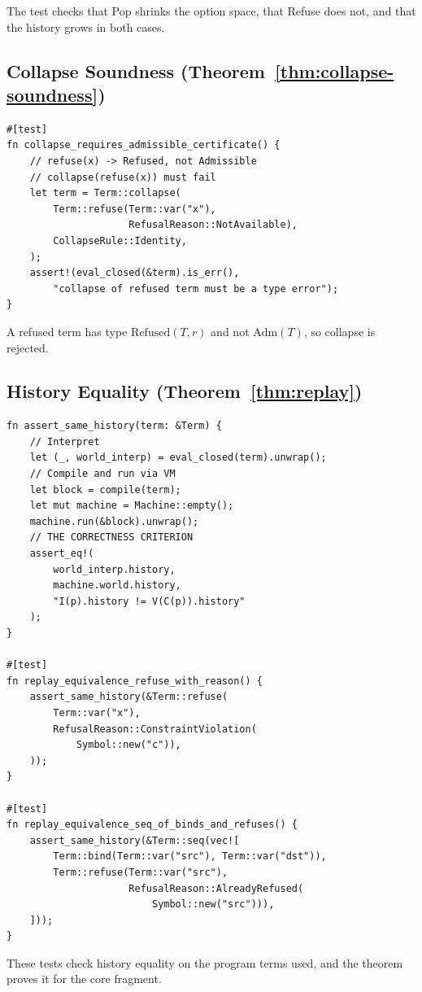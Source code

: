\documentclass[12pt,oneside,openany]{book}
\theoremstyle{spherepop}
\theoremstyle{remarkstyle}
\begin{document}
The test checks that Pop shrinks the option space, that Refuse does not, and that the history grows in both cases.

\subsection*{Collapse Soundness (Theorem~\ref{thm:collapse-soundness})}
\begin{lstlisting}
#[test]
fn collapse_requires_admissible_certificate() {
    // refuse(x) -> Refused, not Admissible
    // collapse(refuse(x)) must fail
    let term = Term::collapse(
        Term::refuse(Term::var("x"),
                     RefusalReason::NotAvailable),
        CollapseRule::Identity,
    );
    assert!(eval_closed(&term).is_err(),
        "collapse of refused term must be a type error");
}
\end{lstlisting}

A refused term has type $\mathrm{Refused}(T,r)$ and not $\mathrm{Adm}(T)$, so collapse is rejected.

\subsection*{History Equality (Theorem~\ref{thm:replay})}
\begin{lstlisting}
fn assert_same_history(term: &Term) {
    // Interpret
    let (_, world_interp) = eval_closed(term).unwrap();
    // Compile and run via VM
    let block = compile(term);
    let mut machine = Machine::empty();
    machine.run(&block).unwrap();
    // THE CORRECTNESS CRITERION
    assert_eq!(
        world_interp.history,
        machine.world.history,
        "I(p).history != V(C(p)).history"
    );
}

#[test]
fn replay_equivalence_refuse_with_reason() {
    assert_same_history(&Term::refuse(
        Term::var("x"),
        RefusalReason::ConstraintViolation(
            Symbol::new("c")),
    ));
}

#[test]
fn replay_equivalence_seq_of_binds_and_refuses() {
    assert_same_history(&Term::seq(vec![
        Term::bind(Term::var("src"), Term::var("dst")),
        Term::refuse(Term::var("src"),
                     RefusalReason::AlreadyRefused(
                         Symbol::new("src"))),
    ]));
}
\end{lstlisting}

These tests check history equality on the program terms used, and the theorem proves it for the core fragment.
\end{document}
